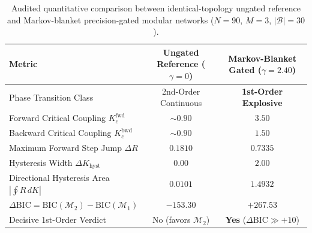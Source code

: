 \documentclass[11pt,a4paper]{article}
\begin{document}
\begin{table}[h]
\centering
\caption{Four-regime factorial ablation ($N = 90$, $5$ seeds) and multi-size threshold scaling ($N \in \{90, 180, 360, 540\}$, $3$ seeds).}
\label{tab:ablation}
\vspace{0.15cm}
\end{table}

\begin{table}[h]
\centering
\caption{Audited quantitative comparison between identical-topology ungated reference and Markov-blanket precision-gated modular networks ($N = 90$, $M = 3$, $|\mathcal{B}| = 30$).}
\label{tab:metrics}
\vspace{0.2cm}
\begin{tabular}{lcc}
\toprule
\textbf{Metric} & \textbf{Ungated Reference ($\gamma = 0$)} & \textbf{Markov-Blanket Gated ($\gamma = 2.40$)} \\
\midrule
Phase Transition Class & 2nd-Order Continuous & \textbf{1st-Order Explosive} \\
Forward Critical Coupling $K_c^{\text{fwd}}$ & $\sim 0.90$ & $\mathbf{3.50}$ \\
Backward Critical Coupling $K_c^{\text{bwd}}$ & $\sim 0.90$ & $\mathbf{1.50}$ \\
Maximum Forward Step Jump $\Delta R$ & $0.1810$ & $\mathbf{0.7335}$ \\
Hysteresis Width $\Delta K_{\text{hyst}}$ & $0.00$ & $\mathbf{2.00}$ \\
Directional Hysteresis Area $|\oint R\,dK|$ & $0.0101$ & $\mathbf{1.4932}$ \\
$\Delta\mathrm{BIC} = \mathrm{BIC}(\mathcal{M}_2) - \mathrm{BIC}(\mathcal{M}_1)$ & $-153.30$ & $\mathbf{+267.53}$ \\
Decisive 1st-Order Verdict & No (favors $\mathcal{M}_2$) & \textbf{Yes} ($\Delta\mathrm{BIC} \gg +10$) \\
\bottomrule
\end{tabular}
\end{table}
\end{document}
